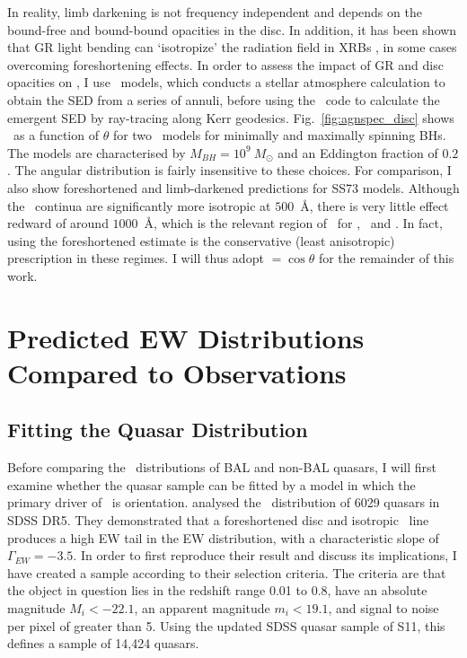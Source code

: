 \noindent
In reality, limb darkening is not frequency independent and 
depends on the bound-free and bound-bound opacities in the disc.
In addition, it has been shown that GR light bending can `isotropize' the radiation
field in XRBs \citep{zhang1997,munozdarias2013}, in some cases overcoming
foreshortening effects. In order to assess the impact of GR and disc opacities
on \ept, I use \agn\ models, which conducts a stellar atmosphere calculation
to obtain the SED from a series of annuli, before using the \kerrtrans\ code \citep{agol1997}
to calculate the emergent SED by ray-tracing along Kerr geodesics.
Fig.~\ref{fig:agnspec_disc} shows \ept\ as a function of 
$\theta$ for two \agn\ models for minimally and maximally spinning BHs. 
The models are characterised by $M_{BH}=10^9~M_\odot$ and an Eddington fraction of $0.2$.
The angular distribution is fairly insensitive to these choices.
For comparison, I also show foreshortened and limb-darkened predictions for SS73 models.
Although the \agn\ continua are significantly more isotropic at $500$~\AA,
there is very little effect redward of around $1000$~\AA, which is the relevant
region of \ept\ for \oiiifull, \civline\ and \mgline . 
In fact, using the foreshortened estimate is the conservative (least anisotropic) prescription 
in these regimes. I will thus adopt \ept$=\cos \theta$ for the remainder of this work.










\section{Predicted EW Distributions Compared to Observations}
\label{sec:mc_angular}

\subsection{Fitting the Quasar Distribution}
\label{sec:fitting}

Before comparing the \ewo\ distributions of BAL and non-BAL quasars,
I will first examine whether the quasar sample can be fitted by a model
in which the primary driver of \ewo\ is orientation.
\citet[][hereafter R11]{risaliti2011} analysed the \ewo\ 
distribution of 6029 quasars in SDSS DR5. They demonstrated
that a foreshortened disc and isotropic \oiiifull\ line produces
a high EW tail in the EW distribution, with a characteristic 
slope of $\Gamma_{EW}=-3.5$. In order to first reproduce their
result and discuss its implications, I have 
created a sample according to their selection
criteria. The criteria are that the object in question lies in the redshift
range 0.01 to 0.8, have an absolute magnitude $M_i<-22.1$, an 
apparent magnitude $m_i<19.1$, and signal to noise per pixel of greater
than 5. Using the updated SDSS quasar sample of S11, this defines
a sample of 14,424 quasars.

